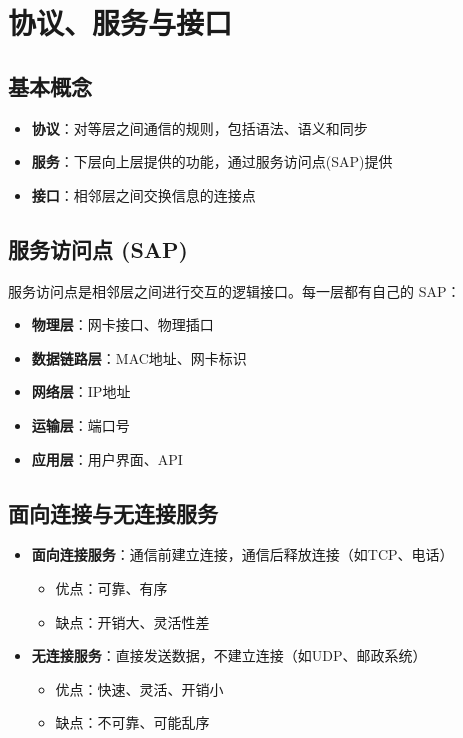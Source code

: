 \section{协议、服务与接口}
\subsection{基本概念}
\begin{itemize}[leftmargin=2em,itemsep=0pt]
    \item \textbf{协议}：对等层之间通信的规则，包括语法、语义和同步
    \item \textbf{服务}：下层向上层提供的功能，通过服务访问点(SAP)提供
    \item \textbf{接口}：相邻层之间交换信息的连接点
\end{itemize}

\subsection{服务访问点 (SAP)}
服务访问点是相邻层之间进行交互的逻辑接口。每一层都有自己的 SAP：
\begin{itemize}[leftmargin=2em,itemsep=0pt]
    \item \textbf{物理层}：网卡接口、物理插口
    \item \textbf{数据链路层}：MAC地址、网卡标识
    \item \textbf{网络层}：IP地址
    \item \textbf{运输层}：端口号
    \item \textbf{应用层}：用户界面、API
\end{itemize}

\subsection{面向连接与无连接服务}
\begin{itemize}[leftmargin=2em,itemsep=0pt]
    \item \textbf{面向连接服务}：通信前建立连接，通信后释放连接（如TCP、电话）
    \begin{itemize}[itemsep=0pt]
        \item 优点：可靠、有序
        \item 缺点：开销大、灵活性差
    \end{itemize}
    \item \textbf{无连接服务}：直接发送数据，不建立连接（如UDP、邮政系统）
    \begin{itemize}[itemsep=0pt]
        \item 优点：快速、灵活、开销小
        \item 缺点：不可靠、可能乱序
    \end{itemize}
\end{itemize}

